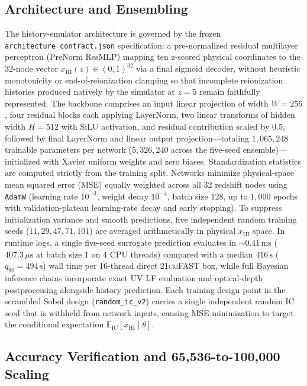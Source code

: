 \documentclass[aps,prd,reprint,superscriptaddress,nofootinbib,amsmath,amssymb,floatfix,longbibliography]{revtex4-2}
\begin{document}
\subsection{Architecture and Ensembling}\label{sec:xhi_arch}

The history-emulator architecture is governed by the frozen \texttt{architecture\_contract.json} specification: a pre-normalized residual multilayer perceptron (PreNorm ResMLP) mapping ten z-scored physical coordinates to the 32-node vector $x_{\mathrm{HI}}(z) \in (0, 1)^{32}$ via a final sigmoid decoder, without heuristic monotonicity or end-of-reionization clamping so that incomplete reionization histories produced natively by the simulator at $z=5$ remain faithfully represented. The backbone comprises an input linear projection of width $W=256$, four residual blocks each applying LayerNorm, two linear transforms of hidden width $H=512$ with $\mathrm{SiLU}$ activation, and residual contribution scaled by $0.5$, followed by final LayerNorm and linear output projection---totaling $1{,}065{,}248$ trainable parameters per network ($5{,}326{,}240$ across the five-seed ensemble)---initialized with Xavier uniform weights and zero biases. Standardization statistics are computed strictly from the training split. Networks minimize physical-space mean squared error (MSE) equally weighted across all 32 redshift nodes using \texttt{AdamW} (learning rate $10^{-3}$, weight decay $10^{-4}$, batch size $128$, up to $1{,}000$ epochs with validation-plateau learning-rate decay and early stopping). To suppress initialization variance and smooth predictions, five independent random training seeds ($11, 29, 47, 71, 101$) are averaged arithmetically in physical $x_{\mathrm{HI}}$ space. In runtime logs, a single five-seed surrogate prediction evaluates in $\sim 0.41\,\mathrm{ms}$ ($407.3\,\mu\mathrm{s}$ at batch size 1 on 4 CPU threads) compared with a median $416\,\mathrm{s}$ ($q_{90}=494\,\mathrm{s}$) wall time per 16-thread direct \textsc{21cmFAST} box, while full Bayesian inference chains incorporate exact UV LF evaluation and optical-depth postprocessing alongside history prediction. Each training design point in the scrambled Sobol design (\texttt{random\_ic\_v2}) carries a single independent random IC seed that is withheld from network inputs, causing MSE minimization to target the conditional expectation $\mathbb{E}_{\mathrm{IC}}[x_{\mathrm{HI}} \mid \theta]$.

\subsection{Accuracy Verification and 65,536-to-100,000 Scaling}\label{sec:xhi_acc}
\end{document}
